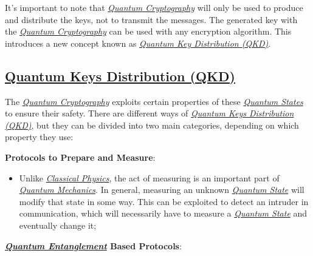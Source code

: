 \documentclass[conference]{IEEEtran}
\begin{document}
\vspace{4pt}

It's important to note that \href{https://en.wikipedia.org/wiki/Quantum_cryptography}{\textit{Quantum Cryptography}} will only be used to produce and distribute the keys, not to transmit the messages. The generated key with the \href{https://en.wikipedia.org/wiki/Quantum_cryptography}{\textit{Quantum Cryptography}} can be used with any encryption algorithm. This introduces a new concept known as \href{https://en.wikipedia.org/wiki/Quantum_key_distribution}{\textit{Quantum Key Distribution (QKD)}}.

\vspace{6pt}

\subsection{\href{https://en.wikipedia.org/wiki/Quantum_key_distribution}{Quantum Keys Distribution (QKD)}}\label{A4}

\vspace{4pt}

The \href{https://en.wikipedia.org/wiki/Quantum_cryptography}{\textit{Quantum Cryptography}} exploits certain properties of these \href{https://en.wikipedia.org/wiki/Quantum_state}{\textit{Quantum States}} to ensure their safety. There are different ways of \href{https://en.wikipedia.org/wiki/Quantum_key_distribution}{\textit{Quantum Keys Distribution (QKD)}}, but they can be divided into two main categories, depending on which property they use:

\vspace{4pt}

\textbf{Protocols to Prepare and Measure}:

\begin{itemize}
    \item Unlike \href{https://en.wikipedia.org/wiki/Classical_physics}{\textit{Classical Physics}}, the act of measuring is an important part of \href{https://en.wikipedia.org/wiki/Quantum_mechanics}{\textit{Quantum Mechanics}}. In general, measuring an unknown \href{https://en.wikipedia.org/wiki/Quantum_state}{\textit{Quantum State}} will modify that state in some way. This can be exploited to detect an intruder in communication, which will necessarily have to measure a \href{https://en.wikipedia.org/wiki/Quantum_state}{\textit{Quantum State}} and eventually change it;
\end{itemize}

\textbf{\href{https://en.wikipedia.org/wiki/Quantum_entanglement}{\textit{Quantum Entanglement}} Based Protocols}:
\end{document}
